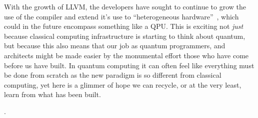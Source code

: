 With the growth of LLVM, the developers have sought to continue to grow the use of the compiler and extend it's use to ``heterogeneous hardware''~\cite{mlir}, which could in the future encompass something like a \ac{QPU}.
This is exciting not \emph{just} because classical computing infrastructure is starting to think about quantum, but because this also means that our job as quantum programmers, and architects might be made easier by the monumental effort those who have come before us have built.
In quantum computing it can often feel like everything must be done from scratch as the new paradigm is so different from classical computing, yet here is a glimmer of hope we can recycle, or at the very least, learn from what has been built.


\cite{classical-peephole}.